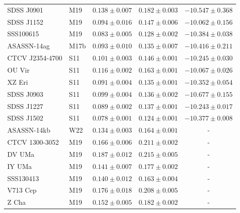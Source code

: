 \begin{table}
\begin{tabular}{llccc}
        SDSS J0901          &  M19      & $0.138 \pm 0.007$ & $0.182 \pm 0.003$ & $-10.547 \pm 0.368$ \\
        SDSS J1152          &  M19      & $0.094 \pm 0.016$ & $0.147 \pm 0.006$ & $-10.062 \pm 0.156$ \\
        SSS100615           &  M19      & $0.083 \pm 0.005$ & $0.128 \pm 0.002$ & $-10.384 \pm 0.038$ \\
        ASASSN-14ag         &  M17b     & $0.093 \pm 0.010$ & $0.135 \pm 0.007$ & $-10.416 \pm 0.211$ \\
        CTCV J2354-4700     &  S11      & $0.101 \pm 0.003$ & $0.146 \pm 0.001$ & $-10.245 \pm 0.030$ \\
        OU Vir              &  S11      & $0.116 \pm 0.002$ & $0.163 \pm 0.001$ & $-10.067 \pm 0.026$ \\
        XZ Eri              &  S11      & $0.091 \pm 0.004$ & $0.135 \pm 0.001$ & $-10.352 \pm 0.054$ \\
        SDSS J0903          &  S11      & $0.099 \pm 0.004$ & $0.136 \pm 0.002$ & $-10.677 \pm 0.155$ \\
        SDSS J1227          &  S11      & $0.089 \pm 0.002$ & $0.137 \pm 0.001$ & $-10.243 \pm 0.017$ \\
        SDSS J1502          &  S11      & $0.078 \pm 0.001$ & $0.124 \pm 0.001$ & $-10.377 \pm 0.008$ \\
        ASASSN-14kb         &  W22      & $0.134 \pm 0.003$ & $0.164 \pm 0.001$ & -                   \\
        CTCV 1300-3052      &  M19      & $0.166 \pm 0.006$ & $0.211 \pm 0.002$ & -                   \\
        DV UMa              &  M19      & $0.187 \pm 0.012$ & $0.215 \pm 0.005$ & -                   \\
        IY UMa              &  M19      & $0.141 \pm 0.007$ & $0.177 \pm 0.002$ & -                   \\
        SSS130413           &  M19      & $0.140 \pm 0.012$ & $0.163 \pm 0.004$ & -                   \\
        V713 Cep            &  M19      & $0.176 \pm 0.018$ & $0.208 \pm 0.005$ & -                   \\
        Z Cha               &  M19      & $0.152 \pm 0.005$ & $0.182 \pm 0.002$ & -                   \\

\end{tabular}
\end{table}
